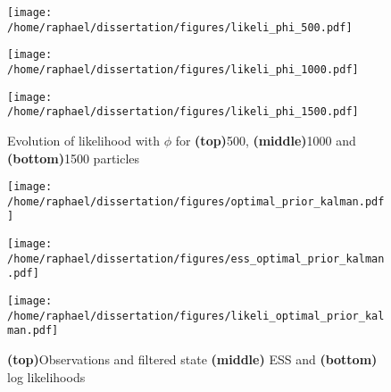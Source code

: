 \documentclass{article}
\begin{document}
		\begin{figure}[htb]
			\centering
			\begin{minipage}{0.6\textwidth}
				\centering
				\texttt{[image: /home/raphael/dissertation/figures/likeli\_phi\_500.pdf]}
			\end{minipage}
			\begin{minipage}{0.6\textwidth}
				\centering
				\texttt{[image: /home/raphael/dissertation/figures/likeli\_phi\_1000.pdf]}
			\end{minipage}
			\begin{minipage}{0.6\textwidth}
				\centering
				\texttt{[image: /home/raphael/dissertation/figures/likeli\_phi\_1500.pdf]}
			\end{minipage}
			\caption{Evolution of likelihood with $\phi$ for \textbf{(top)}500, \textbf{(middle)}1000 and \textbf{(bottom)}1500 particles}
			\label{fig:phikal}
		\end{figure}
		
		\begin{figure}[htb]
			\centering
			\begin{minipage}{0.6\textwidth}
				\centering
				\texttt{[image: /home/raphael/dissertation/figures/optimal\_prior\_kalman.pdf]}
			\end{minipage}
			\begin{minipage}{0.6\textwidth}
				\centering
				\texttt{[image: /home/raphael/dissertation/figures/ess\_optimal\_prior\_kalman.pdf]}
			\end{minipage}
			\begin{minipage}{0.6\textwidth}
				\centering
				\texttt{[image: /home/raphael/dissertation/figures/likeli\_optimal\_prior\_kalman.pdf]}
			\end{minipage}
			\caption{\textbf{(top)}Observations and filtered state \textbf{(middle)} ESS and \textbf{(bottom)} log likelihoods}
			\label{fig:kalman}
		\end{figure}
\end{document}
